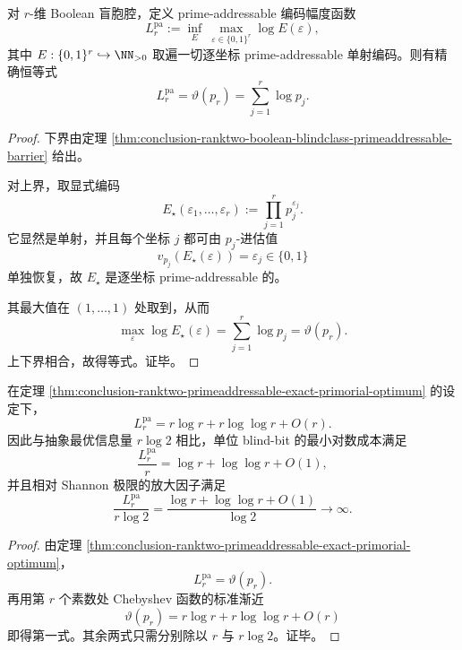 \begin{theorem}\label{thm:conclusion-ranktwo-primeaddressable-exact-primorial-optimum}\label{thm:conclusion-ranktwo-boolean-blindclass-primeaddressable-barrier}
对 \(r\)-维 Boolean 盲胞腔，定义 prime-addressable 编码幅度函数
\[
L_r^{\mathrm{pa}}
:=
\inf_E\ \max_{\varepsilon\in\{0,1\}^r}\log E(\varepsilon),
\]
其中 \(E:\{0,1\}^r\hookrightarrow \NN_{>0}\) 取遍一切逐坐标 prime-addressable 单射编码。则有精确恒等式
\[
\boxed{\;
L_r^{\mathrm{pa}}=\vartheta(p_r)=\sum_{j=1}^{r}\log p_j.\;}
\]
\end{theorem}
\begin{proof}
下界由定理 \ref{thm:conclusion-ranktwo-boolean-blindclass-primeaddressable-barrier} 给出。

对上界，取显式编码
\[
E_\star(\varepsilon_1,\dots,\varepsilon_r):=\prod_{j=1}^{r}p_j^{\varepsilon_j}.
\]
它显然是单射，并且每个坐标 \(j\) 都可由 \(p_j\)-进估值
\[
v_{p_j}(E_\star(\varepsilon))=\varepsilon_j\in\{0,1\}
\]
单独恢复，故 \(E_\star\) 是逐坐标 prime-addressable 的。

其最大值在 \((1,\dots,1)\) 处取到，从而
\[
\max_{\varepsilon}\log E_\star(\varepsilon)=\sum_{j=1}^{r}\log p_j=\vartheta(p_r).
\]
上下界相合，故得等式。证毕。
\end{proof}

\begin{corollary}\label{cor:conclusion-ranktwo-primeaddressable-cost-per-blind-bit-diverges}
在定理 \ref{thm:conclusion-ranktwo-primeaddressable-exact-primorial-optimum} 的设定下，
\[
L_r^{\mathrm{pa}}
=
r\log r+r\log\log r+O(r).
\]
因此与抽象最优信息量 \(r\log 2\) 相比，单位 blind-bit 的最小对数成本满足
\[
\frac{L_r^{\mathrm{pa}}}{r}
=
\log r+\log\log r+O(1),
\]
并且相对 Shannon 极限的放大因子满足
\[
\frac{L_r^{\mathrm{pa}}}{r\log 2}
=
\frac{\log r+\log\log r+O(1)}{\log 2}
\longrightarrow \infty.
\]
\end{corollary}
\begin{proof}
由定理 \ref{thm:conclusion-ranktwo-primeaddressable-exact-primorial-optimum}，
\[
L_r^{\mathrm{pa}}=\vartheta(p_r).
\]
再用第 \(r\) 个素数处 Chebyshev 函数的标准渐近
\[
\vartheta(p_r)=r\log r+r\log\log r+O(r)
\]
即得第一式。其余两式只需分别除以 \(r\) 与 \(r\log 2\)。证毕。
\end{proof}

